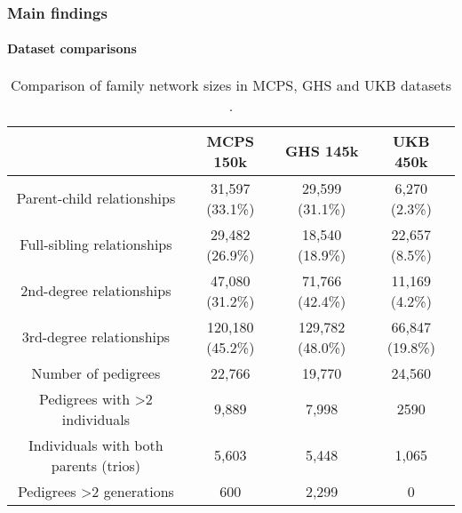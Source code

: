 \begin{frame}
    \frametitle{Main findings}
    \framesubtitle{Dataset comparisons}

    \begin{table}[]
    \caption{Comparison of family network sizes in MCPS, GHS and UKB datasets \parencite{ziyatdinov2023}.}
    \begin{tabular}{@{}cccc@{}}
    \toprule
    \textbf{}                                  & \textbf{MCPS   150k} & \textbf{GHS   145k} & \textbf{UKB   450k} \\ \midrule
    Parent-child relationships                 & 31,597 (33.1\%)      & 29,599 (31.1\%)     & 6,270 (2.3\%)       \\
    Full-sibling relationships                 & 29,482 (26.9\%)      & 18,540 (18.9\%)     & 22,657 (8.5\%)      \\
    2nd-degree relationships                   & 47,080 (31.2\%)      & 71,766 (42.4\%)     & 11,169 (4.2\%)      \\
    3rd-degree relationships                   & 120,180 (45.2\%)     & 129,782 (48.0\%)    & 66,847 (19.8\%)     \\
    Number of pedigrees                        & 22,766               & 19,770              & 24,560              \\
    Pedigrees with \textgreater{}2 individuals & 9,889                & 7,998               & 2590                \\
    Individuals with both parents (trios)      & 5,603                & 5,448               & 1,065               \\
    Pedigrees \textgreater{}2 generations      & 600                  & 2,299               & 0                   \\ \bottomrule
    \end{tabular}
    \label{tab:comparison-families}
    \end{table}
    
\end{frame}
